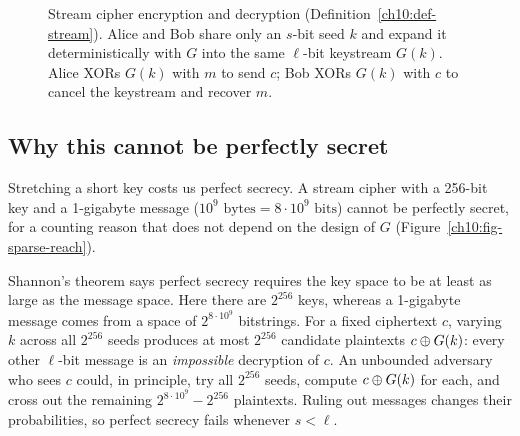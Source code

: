 \begin{figure}[htbp]
\caption{Stream cipher encryption and decryption (Definition~\ref{ch10:def-stream}). Alice and Bob share only an $s$-bit seed $k$ and expand it deterministically with $G$ into the same $\ell$-bit keystream $G(k)$. Alice XORs $G(k)$ with $m$ to send $c$; Bob XORs $G(k)$ with $c$ to cancel the keystream and recover $m$.}
\label{ch10:fig-stream-arch}
\end{figure}

\subsection{Why this cannot be perfectly secret}
\label{ch10:not-perfect}

Stretching a short key costs us perfect secrecy. A stream cipher with a 256-bit key and a 1-gigabyte message ($10^9\text{ bytes} = 8 \cdot 10^9\text{ bits}$) cannot be perfectly secret, for a counting reason that does not depend on the design of $G$ (Figure~\ref{ch10:fig-sparse-reach}).

\begin{whybox}
Shannon's theorem says perfect secrecy requires the key space to be at least as large as the message space. Here there are $2^{256}$ keys, whereas a 1-gigabyte message comes from a space of $2^{8 \cdot 10^9}$ bitstrings. For a fixed ciphertext $c$, varying $k$ across all $2^{256}$ seeds produces at most $2^{256}$ candidate plaintexts $c \oplus G(k)$: every other $\ell$-bit message is an \emph{impossible} decryption of $c$. An unbounded adversary who sees $c$ could, in principle, try all $2^{256}$ seeds, compute $c \oplus G(k)$ for each, and cross out the remaining $2^{8 \cdot 10^9} - 2^{256}$ plaintexts. Ruling out messages changes their probabilities, so perfect secrecy fails whenever $s < \ell$.
\end{whybox}

